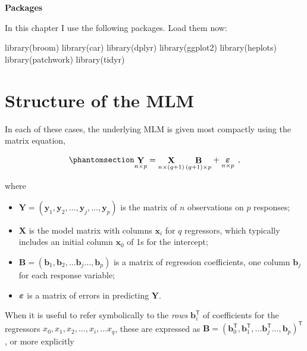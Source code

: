 \documentclass[
  letterpaper,
  10pt,
  krantz2]{krantz}
\makeatletter
\newenvironment{Shaded}{\begin{snugshade}}{\end{snugshade}}
\newcommand{\FunctionTok}[1]{\textcolor[rgb]{0.28,0.35,0.67}{#1}}
\newcommand{\NormalTok}[1]{\textcolor[rgb]{0.00,0.23,0.31}{#1}}
\providecommand{\tightlist}{%
  \setlength{\itemsep}{0pt}\setlength{\parskip}{0pt}}\usepackage{longtable,booktabs,array}
\newenvironment{kframe}{%
  \medskip{}
  \setlength{\fboxsep}{.8em}
  \def\at@end@of@kframe{}%
  \ifinner\ifhmode%
  \def\at@end@of@kframe{\end{minipage}}%
  \begin{minipage}{\columnwidth}%
  \fi\fi%
  \def\FrameCommand##1{\hskip\@totalleftmargin \hskip-\fboxsep
  \colorbox{shadecolor}{##1}\hskip-\fboxsep
      \hskip-\linewidth \hskip-\@totalleftmargin \hskip\columnwidth}%
  \MakeFramed {\advance\hsize-\width
    \@totalleftmargin\z@ \linewidth\hsize
    \@setminipage}}%
{\par\unskip\endMakeFramed%
  \at@end@of@kframe}
\renewenvironment{Shaded}{\begin{kframe}}{\end{kframe}}
\makeatother
\begin{document}
\textbf{Packages}

In this chapter I use the following packages. Load them now:

\begin{Shaded}
\begin{Highlighting}[]
\FunctionTok{library}\NormalTok{(broom)}
\FunctionTok{library}\NormalTok{(car)}
\FunctionTok{library}\NormalTok{(dplyr)}
\FunctionTok{library}\NormalTok{(ggplot2)}
\FunctionTok{library}\NormalTok{(heplots)}
\FunctionTok{library}\NormalTok{(patchwork)}
\FunctionTok{library}\NormalTok{(tidyr)}
\end{Highlighting}
\end{Shaded}

\section{Structure of the MLM}\label{structure-of-the-mlm}

In each of these cases, the underlying MLM is given most compactly using
the matrix equation,

\begin{equation}\phantomsection\label{eq-mlm}{
\mathord{\mathop{\mathbf{Y}}\limits_{n \times p}} = 
\mathord{\mathop{\mathbf{X}}\limits_{n \times (q+1)}} \, \mathord{\mathop{\mathbf{B}}\limits_{(q+1) \times p}} + \mathord{\mathop{\mathbf{\boldsymbol{\Large\varepsilon}}}\limits_{n \times p}} \:\: ,
}\end{equation}

where

\begin{itemize}
\tightlist
\item
  \(\mathbf{Y} = (\mathbf{y}_1 , \mathbf{y}_2, \dots , \mathbf{y}_j, \dots, \mathbf{y}_p )\)
  is the matrix of \(n\) observations on \(p\) responses;
\item
  \(\mathbf{X}\) is the model matrix with columns \(\mathbf{x}_i\) for
  \(q\) regressors, which typically includes an initial column
  \(\mathbf{x}_0\) of 1s for the intercept;
\item
  \(\mathbf{B} = ( \mathbf{b}_1 , \mathbf{b}_2 , \dots \mathbf{b}_j \dots, \mathbf{b}_p )\)
  is a matrix of regression coefficients, one column \(\mathbf{b}_j\)
  for each response variable;
\item
  \(\boldsymbol{\Large\varepsilon}\) is a matrix of errors in predicting
  \(\mathbf{Y}\).
\end{itemize}

When it is useful to refer symbolically to the \emph{rows}
\(\mathbf{b}_i^\mathsf{T}\) of coefficients for the regressors
\(x_0, x_1, x_2, \dots, x_i, \dots x_q\), these are expressed as
\(\mathbf{B} = ( \mathbf{b}_0^\mathsf{T} , \mathbf{b}_1^\mathsf{T} , \dots \mathbf{b}_j^\mathsf{T} \dots, \mathbf{b}_p )^\mathsf{T}\),
or more explicitly
\end{document}
